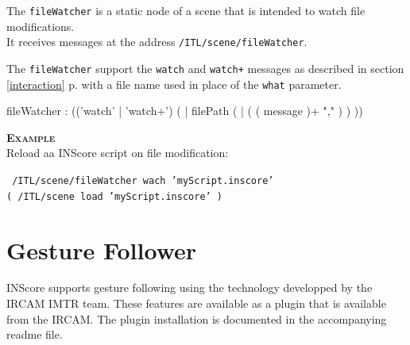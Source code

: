 \documentclass[a4paper,twoside]{report}
\newcommand{\toplevel}[1]	{\chapter{#1}}
\newcommand{\sublevel}[1]	{\section{#1}}
\newcommand{\fullref}[1]	{\ref{#1} p.\pageref{#1}}
\newcommand{\OSC}[1]		{\texttt{#1}}
\newcommand{\example}		{\textbf{\hspace{-1.5cm}\textbf{\textsc{Example }}}}
\newcommand{\sample}	[1]			{\vspace{-2mm}\begin{center}\colorbox{mygrey}{
								\begin{minipage}[t]{0.9\columnwidth} 
								{\small \texttt{#1}}
								\end{minipage}}\end{center}}
\begin{document}
The \OSC{fileWatcher} is a static node of a scene that is intended to watch file modifications. \\
It receives messages at the address \OSC{/ITL/scene/fileWatcher}.

The \OSC{fileWatcher} support the \OSC{watch} and \OSC{watch+} messages as described in section \fullref{interaction} with a file name used in place of the \OSC{what} parameter.

\begin{rail}
fileWatcher : (('watch' | 'watch+')  ( | filePath  ( |  ( ( message  )+ "," ) )  )) 
\end{rail}

\example \\
Reload aa INScore script on file modification:
\sample{
/ITL/scene/fileWatcher wach 'myScript.inscore' \\
\hspace*{3cm}( /ITL/scene load 'myScript.inscore' )
}

%
%
%


\toplevel{Gesture Follower}
\label{GF}

INScore supports gesture following using the technology developped by the IRCAM IMTR team. These features are available as a plugin that is available from the IRCAM. The plugin installation is documented in the accompanying readme file.
\end{document}
